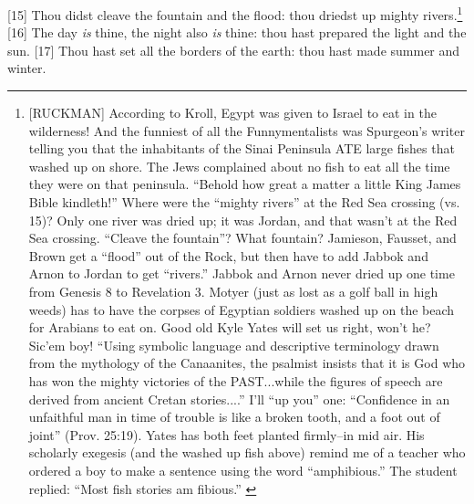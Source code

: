 [15] \textcolor[rgb]{0.00,0.00,1.00}{Thou didst cleave the fountain and the flood: thou driedst up mighty rivers.}\footnote{[RUCKMAN] According to Kroll, Egypt was given to Israel to eat in the wilderness! And the funniest of all the Funnymentalists was Spurgeon’s writer telling you that the inhabitants of the Sinai Peninsula ATE large fishes that washed up on shore. The Jews complained about no fish to eat all the time they were on that peninsula. “Behold how great a matter a little King James Bible kindleth!” Where were the “mighty rivers” at the Red Sea crossing (vs. 15)? Only one river was dried up; it was Jordan, and that wasn’t at the Red Sea crossing. “Cleave the fountain”? What fountain? Jamieson, Fausset, and Brown get a “flood” out of the Rock, but then have to add Jabbok and Arnon to Jordan to get “rivers.” Jabbok and Arnon never dried up one time from Genesis 8 to Revelation 3. Motyer (just as lost as a golf ball in high weeds) has to have the corpses of Egyptian soldiers washed up on the beach for Arabians to eat on. Good old Kyle Yates will set us right, won’t he? Sic’em boy! “Using symbolic language and descriptive terminology drawn from the mythology of the Canaanites, the psalmist insists that it is God who has won the mighty victories of the PAST...while the figures of speech are derived from ancient Cretan stories....” I’ll “up you” one: “Confidence in an unfaithful man in time of trouble is like a broken tooth, and a foot out of joint” (Prov. 25:19). Yates has both feet planted firmly--in mid air. His scholarly exegesis (and the washed up fish above) remind me of a teacher who ordered a boy to make a sentence using the word “amphibious.” The student replied: “Most fish stories am fibious.” \cite{Ruckman1992Psalms} }
[16] \textcolor[rgb]{0.00,0.00,1.00}{The day \emph{is} thine, the night also \emph{is} thine: thou hast prepared the light and the sun.}
[17] \textcolor[rgb]{0.00,0.00,1.00}{Thou hast set all the borders of the earth: thou hast made summer and winter.}
